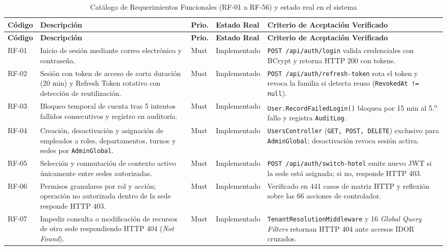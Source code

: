 \documentclass[12pt,a4paper]{article}
\begin{document}
\begin{longtable}{p{1.3cm} p{5.2cm} p{1.3cm} p{2.2cm} p{4.4cm}}
\caption{Cat\'alogo de Requerimientos Funcionales (RF-01 a RF-56) y estado real en el sistema}
\label{tab:requerimientos_funcionales}\\
\toprule
\textbf{C\'odigo} & \textbf{Descripci\'on} & \textbf{Prio.} & \textbf{Estado Real} & \textbf{Criterio de Aceptaci\'on Verificado}\\
\midrule
\endfirsthead
\toprule
\textbf{C\'odigo} & \textbf{Descripci\'on} & \textbf{Prio.} & \textbf{Estado Real} & \textbf{Criterio de Aceptaci\'on Verificado}\\
\midrule
\endhead
\bottomrule
\endfoot
RF-01 & Inicio de sesi\'on mediante correo electr\'onico y contrase\~na. & Must & Implementado & \texttt{POST /api/auth/login} valida credenciales con BCrypt y retorna HTTP 200 con tokens.\\[0.1cm]
RF-02 & Sesi\'on con token de acceso de corta duraci\'on (20 min) y Refresh Token rotativo con detecci\'on de reutilizaci\'on. & Must & Implementado & \texttt{POST /api/auth/refresh-token} rota el token y revoca la familia si detecta reuso (\texttt{RevokedAt != null}).\\[0.1cm]
RF-03 & Bloqueo temporal de cuenta tras 5 intentos fallidos consecutivos y registro en auditor\'ia. & Must & Implementado & \texttt{User.RecordFailedLogin()} bloquea por 15 min al 5.\textsuperscript{o} fallo y registra \texttt{AuditLog}.\\[0.1cm]
RF-04 & Creaci\'on, desactivaci\'on y asignaci\'on de empleados a roles, departamentos, turnos y sedes por \texttt{AdminGlobal}. & Must & Implementado & \texttt{UsersController} (\texttt{GET, POST, DELETE}) exclusivo para \texttt{AdminGlobal}; desactivaci\'on revoca sesi\'on activa.\\[0.1cm]
RF-05 & Selecci\'on y conmutaci\'on de contexto activo \'unicamente entre sedes autorizadas. & Must & Implementado & \texttt{POST /api/auth/switch-hotel} emite nuevo JWT si la sede est\'a asignada; si no, responde HTTP 403.\\[0.1cm]
RF-06 & Permisos granulares por rol y acci\'on; operaci\'on no autorizada dentro de la sede responde HTTP 403. & Must & Implementado & Verificado en 441 casos de matriz HTTP y reflexi\'on sobre las 66 acciones de controlador.\\[0.1cm]
RF-07 & Impedir consulta o modificaci\'on de recursos de otra sede respondiendo HTTP 404 (\textit{Not Found}). & Must & Implementado & \texttt{TenantResolutionMiddleware} y 16 \textit{Global Query Filters} retornan HTTP 404 ante accesos IDOR cruzados.\\[0.1cm]

\end{longtable}
\end{document}
